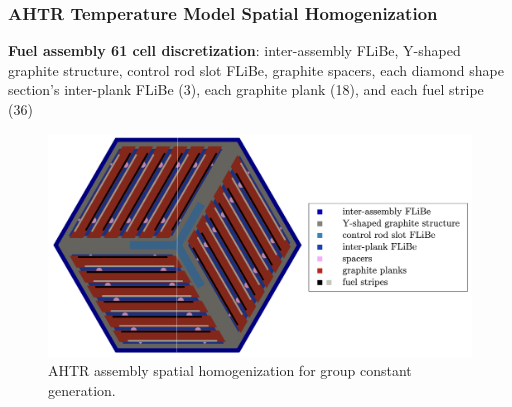 \begin{frame}
    \frametitle{AHTR Temperature Model Spatial Homogenization}
        \textbf{Fuel assembly 61 cell discretization}: inter-assembly FLiBe, 
        Y-shaped graphite structure, control rod slot FLiBe, graphite spacers, 
        each diamond shape section's inter-plank FLiBe (3), each graphite plank (18), 
        and each fuel stripe (36)
    \begin{figure}[]
            \centering
            \includegraphics[width=0.9\linewidth]{figures/assembly_mg_pres.png}
        \caption{AHTR assembly spatial homogenization for group constant generation.}
    \end{figure}
\end{frame}

